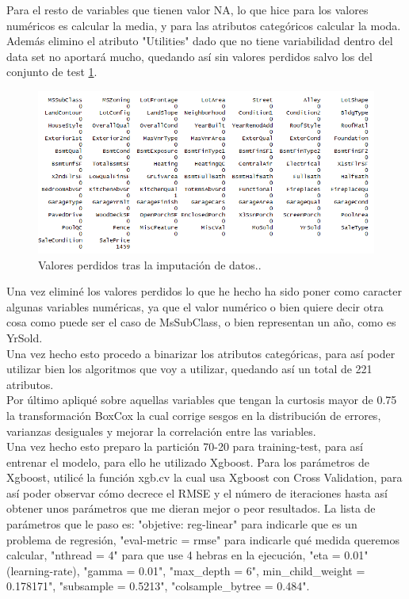 \documentclass[14pt]{extarticle}
\begin{document}
Para el resto de variables que tienen valor NA, lo que hice para los valores numéricos es calcular la media, y para las atributos categóricos calcular la moda. Además elimino el atributo "Utilities" dado que no tiene variabilidad dentro del data set no aportará mucho, quedando así sin valores perdidos salvo los del conjunto de test \ref{im4}. \\

\begin{figure}[h!]
	\centering
	\includegraphics[width=15cm]{img/zerona.png}
	\caption{Valores perdidos tras la imputación de datos..}
	\label{im4}
\end{figure}

Una vez eliminé los valores perdidos lo que he hecho ha sido poner como caracter algunas variables numéricas, ya que el valor numérico o bien quiere decir otra cosa como puede ser el caso de MsSubClass, o bien representan un año, como es YrSold. \\

Una vez hecho esto procedo a binarizar los atributos categóricas, para así poder utilizar bien los algoritmos que voy a utilizar, quedando así un total de 221 atributos. \\

Por último apliqué sobre aquellas variables que tengan la curtosis mayor de 0.75 la transformación BoxCox la cual corrige sesgos en la distribución de errores, varianzas desiguales y mejorar la correlación entre las variables. \\

Una vez hecho esto preparo la partición 70-20 para training-test, para así entrenar el modelo, para ello he utilizado Xgboost. Para los parámetros de Xgboost, utilicé la función xgb.cv la cual usa Xgboost con Cross Validation, para así poder observar cómo decrece el RMSE y el número de iteraciones hasta así obtener unos parámetros que me dieran mejor o peor resultados. La lista de parámetros que le paso es: "objetive: reg-linear" para indicarle que es un problema de regresión, "eval-metric = rmse" para indicarle qué medida queremos calcular, "nthread = 4" para que use 4 hebras en la ejecución, "eta = 0.01" (learning-rate), "gamma = 0.01", "max\_depth = 6", min\_child\_weight = 0.178171", "subsample = 0.5213", "colsample\_bytree = 0.484". \\
\end{document}
